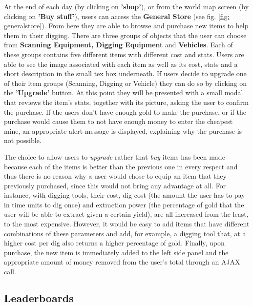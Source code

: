 \documentclass{mproj}
\begin{document}
At the end of each day (by clicking on \textbf{'shop'}), or from the world map screen (by clicking on \textbf{'Buy stuff'}), users can access the \textbf{General Store} (see fig. \ref{fig: generalstore}). From here they are able to browse and purchase new items to help them in their digging. There are three groups of objects that the user can choose from \textbf{Scanning Equipment, Digging Equipment} and \textbf{Vehicles}. Each of these groups contains five different items with different cost and stats. Users are able to see the image associated with each item as well as its cost,  stats and a short description in the small tex box underneath. If users decide to upgrade one of their item groups (Scanning, Digging or Vehicle) they can do so by clicking on the \textbf{'Upgrade'} button. At this point they will be presented with a small modal that reviews the item's stats, together with its picture, asking the user to confirm the purchase. If the users don't have enough gold to make the purchase, or if the purchase would cause them to not have enough money to enter the cheapest mine, an appropriate alert message is displayed, explaining why the purchase is not possible.

The choice to allow users to \emph{upgrade} rather that \emph{buy} items has been made because each of the items is better than the previous one in every respect and thus there is no reason why a user would chose to equip an item that they previously purchased, since this would not bring any advantage at all. For instance, with digging tools, their cost, dig cost (the amount the user has to pay in time units to dig once) and extraction power (the percentage of gold that the user will be able to extract given a certain yield), are all increased from the least, to the most expensive. However, it would be easy to add items that have different combinations of these parameters and add, for example, a digging tool that, at a higher cost per dig also returns a higher percentage of gold.
Finally, upon purchase, the new item is immediately added to the left side panel and the appropriate amount of money removed from the user's total through an AJAX call.

 \subsection{Leaderboards}
\end{document}
